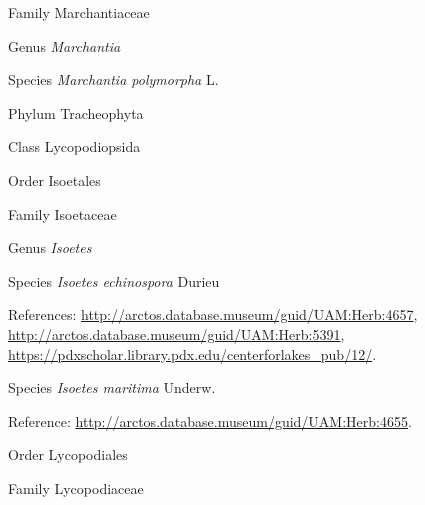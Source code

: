 \documentclass[9pt, article]{memoir}
\begin{document}
\begin{multicols}{2}
\vspace{6pt}\noindent\hspace{24pt}Family Marchantiaceae


\vspace{6pt}\noindent\hspace{30pt}Genus \textit{Marchantia}


\vspace{6pt}\noindent\hspace{36pt}Species \textit{Marchantia polymorpha} L.


\vspace{6pt}\noindent\hspace{6pt}Phylum Tracheophyta


\vspace{6pt}\noindent\hspace{12pt}Class Lycopodiopsida


\vspace{6pt}\noindent\hspace{18pt}Order Isoetales


\vspace{6pt}\noindent\hspace{24pt}Family Isoetaceae


\vspace{6pt}\noindent\hspace{30pt}Genus \textit{Isoetes}


\vspace{6pt}\noindent\hspace{36pt}Species \textit{Isoetes echinospora} Durieu


\vspace{6pt}References: 
\url{http://arctos.database.museum/guid/UAM:Herb:4657}, 
\url{http://arctos.database.museum/guid/UAM:Herb:5391}, 
\url{https://pdxscholar.library.pdx.edu/centerforlakes_pub/12/}.

\vspace{6pt}\noindent\hspace{36pt}Species \textit{Isoetes maritima} Underw.


\vspace{6pt}Reference: 
\url{http://arctos.database.museum/guid/UAM:Herb:4655}.

\vspace{6pt}\noindent\hspace{18pt}Order Lycopodiales


\vspace{6pt}\noindent\hspace{24pt}Family Lycopodiaceae



\end{multicols}
\end{document}
